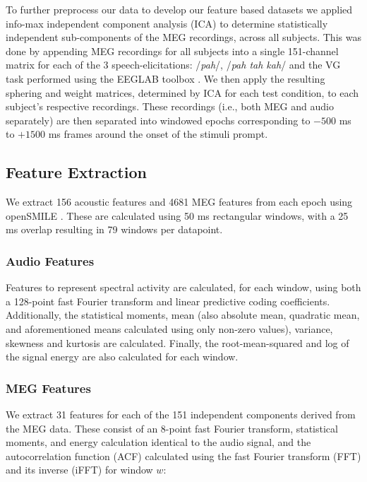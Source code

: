 \documentclass[utf8]{frontiersSCNS} %
\begin{document}
To further preprocess our data to develop our feature based datasets we applied info-max independent component analysis (ICA) \cite{Bell1995} to determine statistically independent sub-components of the MEG recordings, across all subjects. This was done by appending MEG recordings for all subjects into a single 151-channel matrix for each of the 3 speech-elicitations: /{\em pah}/, /{\em pah tah kah}/ and the VG task performed using the EEGLAB toolbox \cite{Delorme04eeglab}. We then apply the resulting sphering and weight matrices, determined by ICA for each test condition, to each subject's respective recordings. These recordings (i.e., both MEG and audio separately) are then separated into windowed epochs corresponding to $-500$ ms to $+1500$ ms frames around the onset of the stimuli prompt.

\subsection{Feature Extraction}

We extract 156 acoustic features and 4681 MEG features from each epoch using openSMILE \cite{Eyben13-RDI}. These are calculated using 50 ms rectangular windows, with a 25 ms overlap resulting in 79 windows per datapoint.

\subsubsection{Audio Features}

Features to represent spectral activity are calculated, for each window, using both a 128-point fast Fourier transform and linear predictive coding coefficients. Additionally, the statistical moments, mean (also absolute mean, quadratic mean, and aforementioned means calculated using only non-zero values), variance, skewness and kurtosis are calculated. Finally, the root-mean-squared and log of the signal energy are also calculated for each window.

\subsubsection{MEG Features}

We extract 31 features for each of the 151 independent components derived from the MEG data. These consist of an 8-point fast Fourier transform, statistical moments, and energy calculation identical to the audio signal, and the autocorrelation function (ACF) calculated using the fast Fourier transform (FFT) and its inverse (iFFT) for window $w$:
\end{document}

